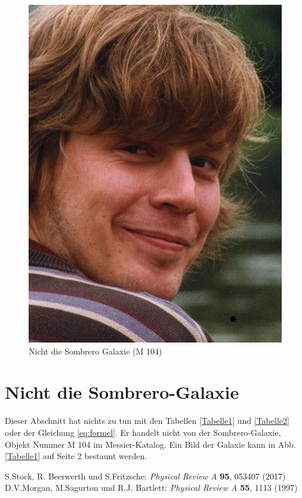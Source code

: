 \documentclass[a4paper, 10pt,onecolumn]{scrartcl}
\begin{document}
\begin{figure}
\centering
\includegraphics[scale=0.25]{tauti.jpg}
\caption{Nicht die Sombrero Galaxie (M 104)}
\end{figure}

\section{Nicht die Sombrero-Galaxie}

Dieser Abschnitt hat nichts zu tun mit den Tabellen \ref{Tabelle1} und \ref{Tabelle2} oder der Gleichung \eqref{eq:formel}. Er handelt nicht von der Sombrero-Galaxie, Objekt Nummer M 104 im Messier-Katalog. Ein Bild der Galaxie kann in Abb. \ref{Tabelle1} auf Seite 2 bestaunt werden.
\newpage

\begin{thebibliography}{2}
	 S.Stock, R. Beerwerth und S.Fritzsche: 
		\emph{Physical Review A} \textbf{95}, 053407 (2017)
	 D.V.Morgan, M.Sagurton und R.J. Bartlett: \emph{Physical Review A} \textbf{55}, 1113 (1997)
\end{thebibliography}
\end{document}
